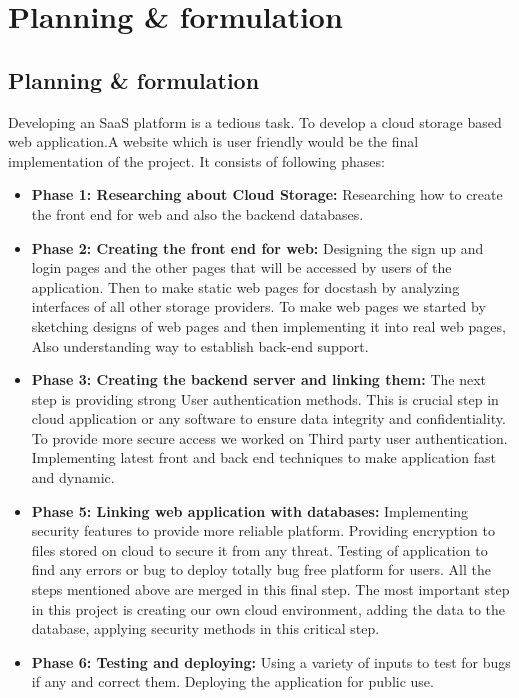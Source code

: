 \chapter{Planning \& formulation}
\newpage
\section{Planning \& formulation}

\hspace{0.6cm} Developing an SaaS platform is a tedious task. To develop a cloud storage based web application.A website which is user friendly would be the final implementation of the project. It consists of following phases:
\begin{itemize}
\item	\textbf{Phase 1: Researching about Cloud Storage:}
    Researching how to create the front end for web and also the backend databases.

\item	\textbf{Phase 2: Creating the front end for web:}
Designing the sign up and login pages and the other pages that will be accessed by users of the application. Then to make static web pages for docstash by analyzing interfaces of all other storage providers. To make web pages we started by sketching designs of web pages and then implementing it into real web pages, Also understanding way to establish back-end support.

\item	\textbf{Phase 3: Creating the backend server and linking them:}
The next step is providing strong User authentication methods. This is crucial step in cloud application or any software to ensure data integrity and confidentiality. To provide more secure access we worked on Third party user authentication. Implementing latest front and back end techniques to make application fast and dynamic.

\item	\textbf{Phase 5: Linking web application with databases:}
Implementing security features to provide more reliable platform. Providing encryption to files stored on cloud to secure it from any threat. Testing of application to find any errors or bug to deploy totally bug free platform for users.  All the steps mentioned above are merged in this final step. The most important step in this project is creating our own cloud environment, adding the data to the database, applying security methods in this critical step. 

\item	\textbf{Phase 6: Testing and deploying:}
Using a variety of inputs to test for bugs if any and correct them. Deploying the application for public use.

\end{itemize}

